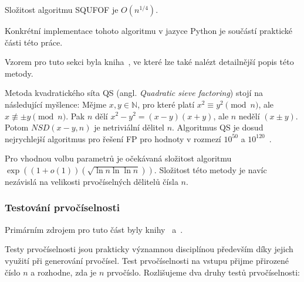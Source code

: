 \documentclass[
  program=infoi,
  biblatex=false,
  figures=true,
  glossaries,
  tables=false,
  sourcecodes=true,
  index
]{kidiplom}
\begin{document}
            \begin{theorem}
                Složitost algoritmu SQUFOF je $O(n^{1/4})$.
            \end{theorem}

            Konkrétní implementace tohoto algoritmu v jazyce Python je součástí praktické části této práce.


        \label{sss:quadratic-sieve}

            Vzorem pro tuto sekci byla kniha~\cite{handbook}, ve které lze také nalézt detailnější popis této metody.

            Metoda kvadratického síta QS (angl. \emph{Quadratic sieve factoring}) stojí na následující myšlence:
            Mějme $x,y \in \mathbb{N}$, pro které platí $x^2 \equiv y^2 \pmod{n}$, ale $x \not\equiv \pm y \pmod{n}$.
            Pak $n$ dělí $x^2-y^2 = (x-y)(x+y)$, ale $n$ nedělí $(x \pm y)$.
            Potom $NSD(x-y, n)$ je netriviální dělitel $n$.
            Algoritmus QS je dosud nejrychlejší algoritmus pro řešení FP pro
            hodnoty v rozmezí $10^{50}$ a $10^{120}$~\cite{squfof-implementation}.

            \begin{theorem}
                Pro vhodnou volbu parametrů je očekávaná složitost algoritmu \\ $\exp{((1 + o(1)) (\sqrt{\ln{n}\ln{\ln{n}}}))}$.
                Složitost této metody je navíc nezávislá na velikosti prvočíselných dělitelů čísla $n$.
            \end{theorem}
        
            
    \subsubsection{Testování prvočíselnosti}\label{ss:primality-testing}

        Primárním zdrojem pro tuto část byly knihy~\cite{handbook} a~\cite{primes-and-factorization}.

        Testy prvočíselnosti jsou prakticky významnou disciplínou především díky jejich využití
        při generování prvočísel.
        Test prvočíselnosti na vstupu přijme přirozené číslo $n$ a rozhodne, zda je $n$ prvočíslo.
        Rozlišujeme dva druhy testů prvočíselnosti:
\end{document}
